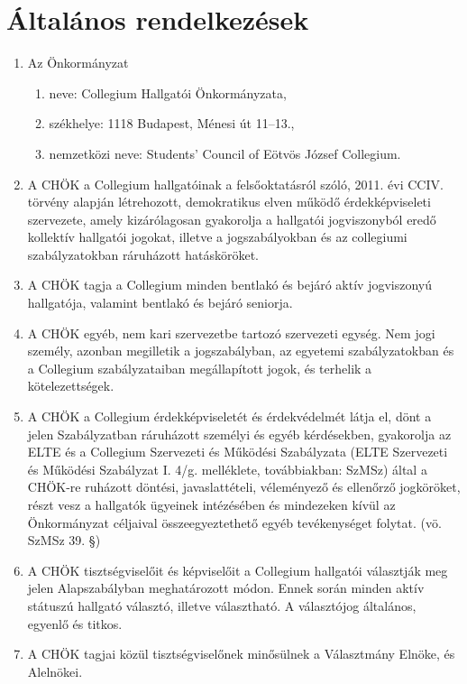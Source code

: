 \documentclass{../styles/rulebook}
\begin{document}
\section{Általános rendelkezések}
\begin{enumerate}
	\item Az Önkormányzat 
	\begin{enumerate}
		\item neve: Collegium Hallgatói Önkormányzata, 
		\item székhelye: 1118 Budapest, Ménesi út 11--13.,
		\item nemzetközi neve: Students’ Council of Eötvös József Collegium.
	\end{enumerate}
	\item A CHÖK a Collegium hallgatóinak a felsőoktatásról szóló, 2011. évi CCIV. törvény alapján létrehozott, demokratikus elven működő érdekképviseleti szervezete, amely kizárólagosan gyakorolja a hallgatói jogviszonyból eredő kollektív hallgatói jogokat, illetve a jogszabályokban és az collegiumi szabályzatokban ráruházott hatásköröket. 
	\item A CHÖK tagja a Collegium minden bentlakó és bejáró aktív jogviszonyú hallgatója, valamint bentlakó és bejáró seniorja.
	\item A CHÖK egyéb, nem kari szervezetbe tartozó szervezeti egység. Nem jogi személy, azonban megilletik a jogszabályban, az egyetemi szabályzatokban és a Collegium szabályzataiban megállapított jogok, és terhelik a kötelezettségek.
	\item A CHÖK a Collegium érdekképviseletét és érdekvédelmét látja el, dönt a jelen Szabályzatban ráruházott személyi és egyéb kérdésekben, gyakorolja az ELTE és a Collegium Szervezeti és Működési Szabályzata (ELTE Szervezeti és Működési Szabályzat I. 4/g. melléklete, továbbiakban: SzMSz) által a CHÖK-re ruházott döntési, javaslattételi, véleményező és ellenőrző jogköröket, részt vesz a hallgatók ügyeinek intézésében és mindezeken kívül az Önkormányzat céljaival összeegyeztethető egyéb tevékenységet folytat. (vö. SzMSz 39. §)
	\item A CHÖK tisztségviselőit és képviselőit a Collegium hallgatói választják meg jelen Alapszabályban meghatározott módon. Ennek során minden aktív státuszú hallgató választó, illetve választható. A választójog általános, egyenlő és titkos.
	\item A CHÖK tagjai közül tisztségviselőnek minősülnek a Választmány Elnöke, és Alelnökei.
	
\end{enumerate}
\end{document}
